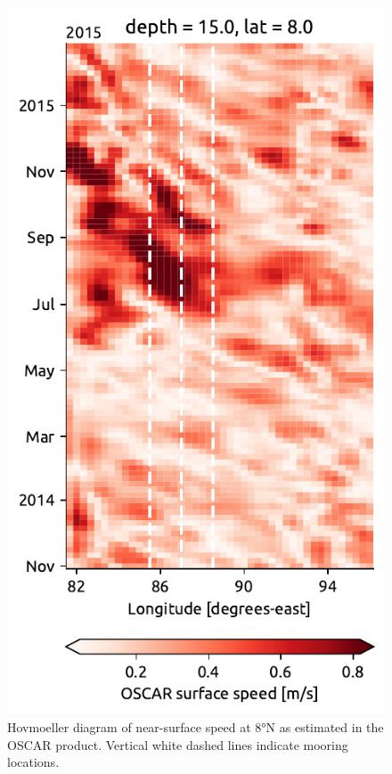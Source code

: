 \documentclass[twocol]{ametsoc}
\begin{document}
\begin{figure}[htbp]
\centering
\includegraphics[width=\columnwidth]{figure8-oscar.pdf}
\caption{\label{fig:hov}
Hovmoeller diagram of near-surface speed at 8°N as estimated in the OSCAR product. Vertical white dashed lines indicate mooring locations.}
\end{figure}
\end{document}
